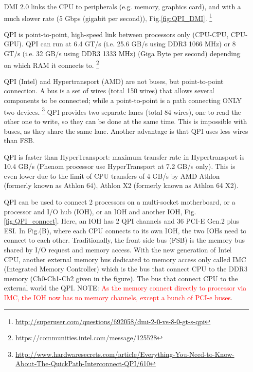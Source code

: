 \begin{mdframed}
DMI 2.0 links the CPU to peripherals (e.g. memory, graphics card), and with a
much slower rate (5 Gbps (gigabit per second)), Fig.\ref{fig:QPI_DMI}.
\footnote{\url{http://superuser.com/questions/692058/dmi-2-0-vs-8-0-gt-s-qpi}}

QPI is point-to-point, high-speed link between processors only (CPU-CPU,
CPU-GPU). QPI can run at 6.4 GT/s (i.e. 25.6 GB/s using DDR3 1066 MHz) or 8 GT/s
(i.e. 32 GB/s using DDR3 1333 MHz) (Giga Byte per second) depending on which RAM
it connects to. \footnote{\url{https://communities.intel.com/message/125528}}

QPI (Intel) and Hypertransport (AMD) are not buses, but point-to-point
connection. A bus is a set of wires (total 150 wires) that allows several
components to be connected; while a point-to-point is a path connecting ONLY two devices.
\footnote{\url{http://www.hardwaresecrets.com/article/Everything-You-Need-to-Know-About-The-QuickPath-Interconnect-QPI/610}}
QPI provides two separate lanes (total 84 wires), one to read the other one to
write, so they can be done at the same time. This is impossible with buses, as they share the same
lane. Another advantage is that QPI uses less wires than FSB. 

QPI is faster than HyperTransport: maximum transfer rate in Hypertransport is
10.4 GB/s (Phenom processor use HyperTransport at 7.2 GB/s only). This is even
lower due to the limit of CPU transfers of 4 GB/s by AMD Athlon (formerly known
as Athlon 64), Athlon X2 (formerly known as Athlon 64 X2).
\end{mdframed}


QPI can be used to connect 2 processors on a multi-socket motherboard, or a
processor and I/O hub (IOH), or an IOH and another IOH,
Fig.\ref{fig:QPI_connect}. Here, an IOH has 2 QPI channels and 36 PCI-E Gen.2
plus ESI. In Fig.(B), where each CPU connects to its own IOH, the two IOHs need
to connect to each other. Traditionally, the front side bus (FSB) is the memory
bus shared by I/O request and memory access. With the new generation of Intel
CPU, another external memory bus dedicated to memory access only called IMC
(Integrated Memory Controller) which is the bus that connect CPU to the DDR3
memory (Ch0-Ch1-Ch2 given in the figure). The bus that connect CPU to the
external world the QPI. NOTE: \textcolor{red}{As the memory connect directly
to processor via IMC, the IOH now has no memory channels, except a bunch of
PCI-e buses}.

% 

